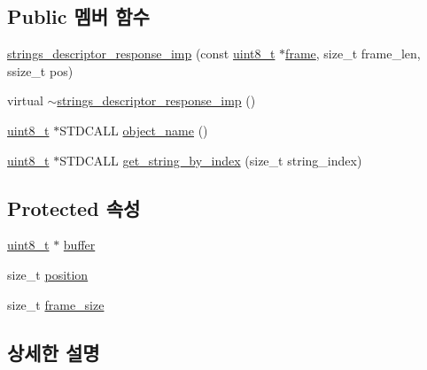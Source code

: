 \subsection*{Public 멤버 함수}
\begin{DoxyCompactItemize}
\item 
\hyperlink{classavdecc__lib_1_1strings__descriptor__response__imp_a74c16fd0049e0413e2f5f36c22660326}{strings\+\_\+descriptor\+\_\+response\+\_\+imp} (const \hyperlink{stdint_8h_aba7bc1797add20fe3efdf37ced1182c5}{uint8\+\_\+t} $\ast$\hyperlink{gst__avb__playbin_8c_ac8e710e0b5e994c0545d75d69868c6f0}{frame}, size\+\_\+t frame\+\_\+len, ssize\+\_\+t pos)
\item 
virtual \hyperlink{classavdecc__lib_1_1strings__descriptor__response__imp_a3108285fa1be7e61029f8d81a122fbf7}{$\sim$strings\+\_\+descriptor\+\_\+response\+\_\+imp} ()
\item 
\hyperlink{stdint_8h_aba7bc1797add20fe3efdf37ced1182c5}{uint8\+\_\+t} $\ast$S\+T\+D\+C\+A\+LL \hyperlink{classavdecc__lib_1_1strings__descriptor__response__imp_a15837e3eb254ad44812cb766ae8cd53c}{object\+\_\+name} ()
\item 
\hyperlink{stdint_8h_aba7bc1797add20fe3efdf37ced1182c5}{uint8\+\_\+t} $\ast$S\+T\+D\+C\+A\+LL \hyperlink{classavdecc__lib_1_1strings__descriptor__response__imp_ad106ef09d794e7fb8b344e6f17b1f44a}{get\+\_\+string\+\_\+by\+\_\+index} (size\+\_\+t string\+\_\+index)
\end{DoxyCompactItemize}
\subsection*{Protected 속성}
\begin{DoxyCompactItemize}
\item 
\hyperlink{stdint_8h_aba7bc1797add20fe3efdf37ced1182c5}{uint8\+\_\+t} $\ast$ \hyperlink{classavdecc__lib_1_1descriptor__response__base__imp_a56ed84df35de10bdb65e72b184309497}{buffer}
\item 
size\+\_\+t \hyperlink{classavdecc__lib_1_1descriptor__response__base__imp_a7a04afe5347934be732ec70a70bd0a28}{position}
\item 
size\+\_\+t \hyperlink{classavdecc__lib_1_1descriptor__response__base__imp_affd041a595cabab98275245b9cb2824d}{frame\+\_\+size}
\end{DoxyCompactItemize}


\subsection{상세한 설명}


